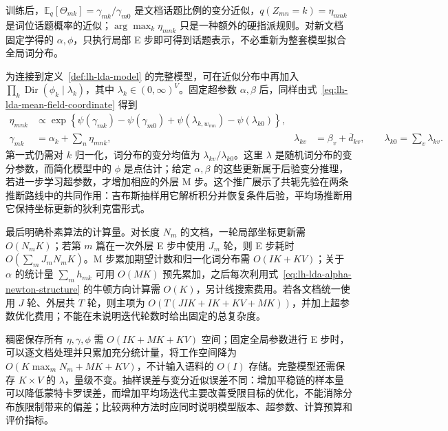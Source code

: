 训练后，$\mathbb E_q[\Theta_{mk}]=\gamma_{mk}/\gamma_{m0}$ 是文档话题比例的变分近似，$q(Z_{mn}=k)=\eta_{mnk}$ 是词位话题概率的近似；$\arg\max_k\eta_{mnk}$ 只是一种额外的硬指派规则。对新文档固定学得的 $\alpha,\phi$，只执行局部 E 步即可得到话题表示，不必重新为整套模型拟合全局词分布。

为连接到定义~\ref{def:lh-lda-model} 的完整模型，可在近似分布中再加入 $\prod_k\operatorname{Dir}(\phi_k\mid\lambda_k)$，其中 $\lambda_k\in(0,\infty)^V$。固定超参数 $\alpha,\beta$ 后，同样由式~\eqref{eq:lh-lda-mean-field-coordinate} 得到
\begin{align}
\eta_{mnk}&\propto\exp\left\{
\psi(\gamma_{mk})-\psi(\gamma_{m0})
+\psi(\lambda_{k,w_{mn}})-\psi(\lambda_{k0})\right\},
\label{eq:lh-lda-full-vi-eta}\\
\gamma_{mk}&=\alpha_k+\sum_n\eta_{mnk},&
\lambda_{kv}&=\beta_v+\overline d_{kv},\qquad\lambda_{k0}=\sum_v\lambda_{kv}.
\label{eq:lh-lda-full-vi-dirichlet}
\end{align}
第一式仍需对 $k$ 归一化，词分布的变分均值为 $\lambda_{kv}/\lambda_{k0}$。这里 $\lambda$ 是随机词分布的变分参数，而简化模型中的 $\phi$ 是点估计；给定 $\alpha,\beta$ 的这些更新属于后验变分推理，若进一步学习超参数，才增加相应的外层 M 步。这个推广展示了共轭先验在两条推断路线中的共同作用：吉布斯抽样用它解析积分并恢复条件后验，平均场推断用它保持坐标更新的狄利克雷形式。

最后明确朴素算法的计算量。对长度 $N_m$ 的文档，一轮局部坐标更新需 $O(N_mK)$；若第 $m$ 篇在一次外层 E 步中使用 $J_m$ 轮，则 E 步耗时 $O(\sum_mJ_mN_mK)$。M 步累加期望计数和归一化词分布需 $O(IK+KV)$；关于 $\alpha$ 的统计量 $\sum_mh_{mk}$ 可用 $O(MK)$ 预先累加，之后每次利用式~\eqref{eq:lh-lda-alpha-newton-structure} 的牛顿方向计算需 $O(K)$，另计线搜索费用。若各文档统一使用 $J$ 轮、外层共 $T$ 轮，则主项为 $O(T(JIK+IK+KV+MK))$，并加上超参数优化费用；不能在未说明迭代轮数时给出固定的总复杂度。

稠密保存所有 $\eta,\gamma,\phi$ 需 $O(IK+MK+KV)$ 空间；固定全局参数进行 E 步时，可以逐文档处理并只累加充分统计量，将工作空间降为 $O(K\max_mN_m+MK+KV)$，不计输入语料的 $O(I)$ 存储。完整模型还需保存 $K\times V$ 的 $\lambda$，量级不变。抽样误差与变分近似误差不同：增加平稳链的样本量可以降低蒙特卡罗误差，而增加平均场迭代主要改善受限目标的优化，不能消除分布族限制带来的偏差；比较两种方法时应同时说明模型版本、超参数、计算预算和评价指标。





